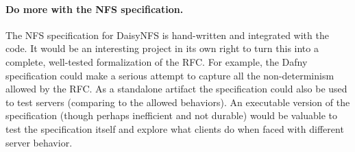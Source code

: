 \paragraph{Do more with the NFS specification.} The NFS specification for
DaisyNFS is hand-written and integrated with the code. It would be an
interesting project in its own right to turn this into a complete, well-tested
formalization of the RFC. For example, the Dafny specification could make a serious
attempt to capture all the non-determinism allowed by the RFC. As a standalone
artifact the specification could also be used to test servers (comparing to the
allowed behaviors). An executable version of the specification (though perhaps
inefficient and not durable) would be valuable to test the specification itself
and explore what clients do when faced with different server behavior.
